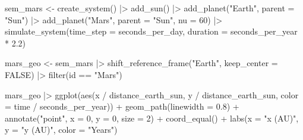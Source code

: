 \documentclass[
  10.5pt,
  letterpaper,
]{scrbook}
\newenvironment{Shaded}{\begin{snugshade}}{\end{snugshade}}
\newcommand{\AttributeTok}[1]{\textcolor[rgb]{0.00,0.00,0.00}{#1}}
\newcommand{\ConstantTok}[1]{\textcolor[rgb]{0.00,0.00,0.00}{#1}}
\newcommand{\DecValTok}[1]{\textcolor[rgb]{0.00,0.00,0.00}{#1}}
\newcommand{\FloatTok}[1]{\textcolor[rgb]{0.00,0.00,0.00}{#1}}
\newcommand{\FunctionTok}[1]{\textcolor[rgb]{0.00,0.00,0.00}{#1}}
\newcommand{\NormalTok}[1]{\textcolor[rgb]{0.00,0.00,0.00}{#1}}
\newcommand{\OtherTok}[1]{\textcolor[rgb]{0.00,0.00,0.00}{#1}}
\newcommand{\SpecialCharTok}[1]{\textcolor[rgb]{0.00,0.00,0.00}{#1}}
\newcommand{\StringTok}[1]{\textcolor[rgb]{0.00,0.00,0.00}{#1}}
\theoremstyle{plain}
\theoremstyle{remark}
\begin{document}
\begin{Shaded}
\begin{Highlighting}[]
\NormalTok{sem\_mars }\OtherTok{\textless{}{-}} \FunctionTok{create\_system}\NormalTok{() }\SpecialCharTok{|\textgreater{}}
  \FunctionTok{add\_sun}\NormalTok{() }\SpecialCharTok{|\textgreater{}}
  \FunctionTok{add\_planet}\NormalTok{(}\StringTok{"Earth"}\NormalTok{, }\AttributeTok{parent =} \StringTok{"Sun"}\NormalTok{) }\SpecialCharTok{|\textgreater{}}
  \FunctionTok{add\_planet}\NormalTok{(}\StringTok{"Mars"}\NormalTok{,  }\AttributeTok{parent =} \StringTok{"Sun"}\NormalTok{, }\AttributeTok{nu =} \DecValTok{60}\NormalTok{) }\SpecialCharTok{|\textgreater{}}
  \FunctionTok{simulate\_system}\NormalTok{(}\AttributeTok{time\_step =}\NormalTok{ seconds\_per\_day, }\AttributeTok{duration =}\NormalTok{ seconds\_per\_year }\SpecialCharTok{*} \FloatTok{2.2}\NormalTok{)}

\NormalTok{mars\_geo }\OtherTok{\textless{}{-}}\NormalTok{ sem\_mars }\SpecialCharTok{|\textgreater{}}
  \FunctionTok{shift\_reference\_frame}\NormalTok{(}\StringTok{"Earth"}\NormalTok{, }\AttributeTok{keep\_center =} \ConstantTok{FALSE}\NormalTok{) }\SpecialCharTok{|\textgreater{}}
  \FunctionTok{filter}\NormalTok{(id }\SpecialCharTok{==} \StringTok{"Mars"}\NormalTok{)}
\end{Highlighting}
\end{Shaded}

\begin{Shaded}
\begin{Highlighting}[]
\NormalTok{mars\_geo }\SpecialCharTok{|\textgreater{}}
  \FunctionTok{ggplot}\NormalTok{(}\FunctionTok{aes}\NormalTok{(x }\SpecialCharTok{/}\NormalTok{ distance\_earth\_sun, y }\SpecialCharTok{/}\NormalTok{ distance\_earth\_sun,}
             \AttributeTok{color =}\NormalTok{ time }\SpecialCharTok{/}\NormalTok{ seconds\_per\_year)) }\SpecialCharTok{+}
  \FunctionTok{geom\_path}\NormalTok{(}\AttributeTok{linewidth =} \FloatTok{0.8}\NormalTok{) }\SpecialCharTok{+}
  \FunctionTok{annotate}\NormalTok{(}\StringTok{"point"}\NormalTok{, }\AttributeTok{x =} \DecValTok{0}\NormalTok{, }\AttributeTok{y =} \DecValTok{0}\NormalTok{, }\AttributeTok{size =} \DecValTok{2}\NormalTok{) }\SpecialCharTok{+}
  \FunctionTok{coord\_equal}\NormalTok{() }\SpecialCharTok{+}
  \FunctionTok{labs}\NormalTok{(}\AttributeTok{x =} \StringTok{"x (AU)"}\NormalTok{, }\AttributeTok{y =} \StringTok{"y (AU)"}\NormalTok{, }\AttributeTok{color =} \StringTok{"Years"}\NormalTok{)}
\end{Highlighting}
\end{Shaded}
\end{document}
